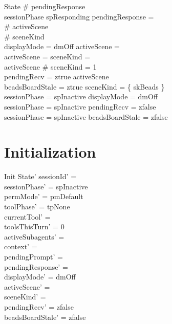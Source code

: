\documentclass[a4paper,10pt,fleqn]{article}
\begin{document}
\begin{schema}{State}
  \# pendingResponse  \\
  sessionPhase \neq spResponding \implies pendingResponse = \emptyset \\
  \# activeScene  \\
  \# sceneKind  \\
  displayMode = dmOff \implies activeScene = \emptyset \\
  activeScene = \emptyset \implies sceneKind = \emptyset \\
  activeScene \neq \emptyset \implies \# sceneKind = 1 \\
  pendingRecv = ztrue \implies activeScene \neq \emptyset \\
  beadsBoardStale = ztrue \implies sceneKind = \{ skBeads \} \\
  sessionPhase = spInactive \implies displayMode = dmOff \\
  sessionPhase = spInactive \implies pendingRecv = zfalse \\
  sessionPhase = spInactive \implies beadsBoardStale = zfalse
\end{schema}

\section{Initialization}

\begin{schema}{Init}
  State'
  \where
  sessionId' = \emptyset \\
  sessionPhase' = spInactive \\
  permMode' = pmDefault \\
  toolPhase' = tpNone \\
  currentTool' = \emptyset \\
  toolsThisTurn' = 0 \\
  activeSubagents' = \emptyset \\
  context' = \langle \rangle \\
  pendingPrompt' = \emptyset \\
  pendingResponse' = \emptyset \\
  displayMode' = dmOff \\
  activeScene' = \emptyset \\
  sceneKind' = \emptyset \\
  pendingRecv' = zfalse \\
  beadsBoardStale' = zfalse
\end{schema}
\end{document}
